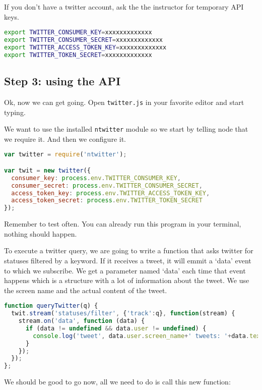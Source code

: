 \documentclass[a4paper]{report}
\begin{document}
If you don't have a twitter account, ask the the instructor for temporary API keys.

\begin{lstlisting}[language=bash]
export TWITTER_CONSUMER_KEY=xxxxxxxxxxxxx
export TWITTER_CONSUMER_SECRET=xxxxxxxxxxxxx
export TWITTER_ACCESS_TOKEN_KEY=xxxxxxxxxxxxx
export TWITTER_TOKEN_SECRET=xxxxxxxxxxxxx
\end{lstlisting}

\subsection*{Step 3: using the API}
Ok, now we can get going. Open \texttt{twitter.js} in your favorite editor and start typing.

We want to use the installed \texttt{ntwitter} module so we start by telling node that we require it. And then we configure it.

\begin{lstlisting}[language=JavaScript]
var twitter = require('ntwitter');

var twit = new twitter({
  consumer_key: process.env.TWITTER_CONSUMER_KEY,
  consumer_secret: process.env.TWITTER_CONSUMER_SECRET,
  access_token_key: process.env.TWITTER_ACCESS_TOKEN_KEY,
  access_token_secret: process.env.TWITTER_TOKEN_SECRET
});
\end{lstlisting}

\noindent Remember to test often. You can already run this program in your terminal, nothing should happen.

\noindent To execute a twitter query, we are going to write a function that asks twitter for statuses filtered by a keyword. If it receives a tweet, it will emmit a `data' event to which we subscribe. We get a parameter named `data' each time that event happens which is a structure with a lot of information about the tweet. We use the screen name and the actual content of the tweet.

\begin{lstlisting}[language=JavaScript]
function queryTwitter(q) { 
  twit.stream('statuses/filter', {'track':q}, function(stream) {
    stream.on('data', function (data) {
      if (data != undefined && data.user != undefined) {
        console.log('tweet', data.user.screen_name+' tweets: '+data.text);
      }
    });
  });
};
\end{lstlisting}

\noindent We should be good to go now, all we need to do is call this new function:
\end{document}
